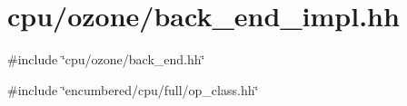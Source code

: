 \hypertarget{back__end__impl_8hh}{
\section{cpu/ozone/back\_\-end\_\-impl.hh}
\label{back__end__impl_8hh}
}
{\ttfamily \#include \char`\"{}cpu/ozone/back\_\-end.hh\char`\"{}}\par
{\ttfamily \#include \char`\"{}encumbered/cpu/full/op\_\-class.hh\char`\"{}}\par
